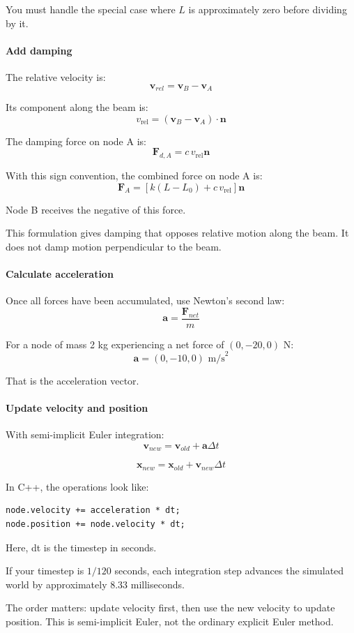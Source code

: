 \documentclass[11pt, a4paper]{article}
\begin{document}
You must handle the special case where \(L\) is approximately zero before dividing by it.

\paragraph{Add damping}
The relative velocity is:
\[
\mathbf{v}_{rel}=\mathbf{v}_B-\mathbf{v}_A
\]

Its component along the beam is:
\[
v_{\mathrm{rel}}=
(\mathbf{v}_B-\mathbf{v}_A)\cdot\mathbf{n}
\]

The damping force on node A is:
\[
\mathbf{F}_{d,A}=c\,v_{\mathrm{rel}}\mathbf{n}
\]

With this sign convention, the combined force on node A is:
\[
\mathbf{F}_A=
\left[k(L-L_0)+c\,v_{\mathrm{rel}}\right]\mathbf{n}
\]

Node B receives the negative of this force.

This formulation gives damping that opposes relative motion along the beam. It does not damp motion perpendicular to the beam.

\paragraph{Calculate acceleration}
Once all forces have been accumulated, use Newton's second law:
\[
\mathbf{a}=\frac{\mathbf{F}_{net}}{m}
\]

For a node of mass 2 kg experiencing a net force of \((0,-20,0)\) N:
\[
\mathbf{a}=(0,-10,0)\text{ m/s}^2
\]

That is the acceleration vector.

\paragraph{Update velocity and position}
With semi-implicit Euler integration:
\[
\mathbf{v}_{new}=\mathbf{v}_{old}+\mathbf{a}\Delta t
\]

\[
\mathbf{x}_{new}=\mathbf{x}_{old}+\mathbf{v}_{new}\Delta t
\]

\noindent In C++, the operations look like:

\begin{lstlisting}
node.velocity += acceleration * dt;
node.position += node.velocity * dt;
\end{lstlisting}

Here, dt is the timestep in seconds.

If your timestep is \(1/120\) seconds, each integration step advances the simulated world by approximately 8.33 milliseconds.

The order matters: update velocity first, then use the new velocity to update position. This is semi-implicit Euler, not the ordinary explicit Euler method.
\end{document}
